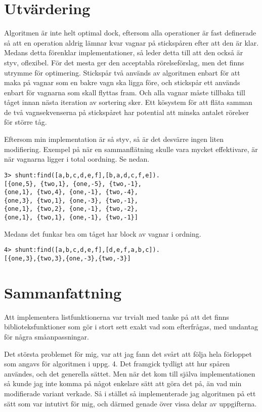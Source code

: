 \documentclass[a4paper, 11pt]{article}
\begin{document}
\section{Utvärdering}

Algoritmen är inte helt optimal dock, eftersom alla operationer är fast definerade så att en operation aldrig lämnar kvar vagnar på stickspåren efter att den är klar. Medans detta förenklar implementationer, så leder detta till att den också är styv, oflexibel. För det mesta ger den acceptabla rörelseförslag, men det finns utrymme för optimering. Stickspår två används av algoritmen enbart för att maka på vagnar som en bakre vagn ska ligga före, och stickspår ett används enbart för vagnarna som skall flyttas fram. Och alla vagnar måste tillbaka till tåget innan nästa iteration av sortering sker. Ett kösystem för att fläta samman de två vagnsekvenserna på stickspåret har potential att minska antalet rörelser för större tåg.

Eftersom min implementation är så styv, så är det desvärre ingen liten modifiering. Exempel på när en sammanflätning skulle vara mycket effektivare, är när vagnarna ligger i total oordning. Se nedan.
\begin{verbatim}
3> shunt:find([a,b,c,d,e,f],[b,a,d,c,f,e]).
[{one,5}, {two,1}, {one,-5}, {two,-1},
{one,1}, {two,4}, {one,-1}, {two,-4},
{one,3}, {two,1}, {one,-3}, {two,-1},
{one,1}, {two,2}, {one,-1}, {two,-2},
{one,1}, {two,1}, {one,-1}, {two,-1}]
\end{verbatim}

Medans det funkar bra om tåget har block av vagnar i ordning.
\begin{verbatim}
4> shunt:find([a,b,c,d,e,f],[d,e,f,a,b,c]).
[{one,3},{two,3},{one,-3},{two,-3}]
\end{verbatim}


\section{Sammanfattning}

Att implementera listfunktionerna var trvialt med tanke på att det finns biblioteksfunktioner som gör i stort sett exakt vad som efterfrågas, med undantag för några småanpassningar.

Det största problemet för mig, var att jag fann det svårt att följa hela förloppet som angavs för algoritmen i uppg. 4. Det framgick tydligt att hur spåren användes, och det generella sättet. Men när det kom till själva implementationen så kunde jag inte komma på något enkelare sätt att göra det på, än vad min modifierade variant verkade. Så i stället så implementerade jag algoritmen på ett sätt som var intutivt för mig, och därmed genade över vissa delar av uppgifterna.
\end{document}
